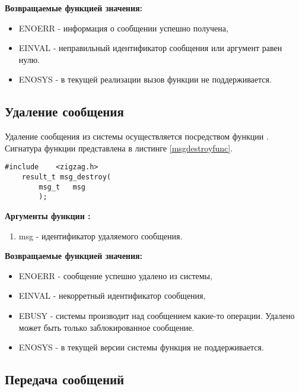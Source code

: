 {\bfseries Возвращаемые функцией  значения:}

{\itshape
\begin{itemize}
\item ENOERR - информация о сообщении успешно получена,
\item EINVAL - неправильный идентификатор сообщения или аргумент  равен нулю.
\item ENOSYS - в текущей реализации вызов функции не поддерживается.
\end{itemize}
}

\subsection{Удаление сообщения}

Удаление сообщения из системы осуществляется посредством функции . 
Сигнатура функции представлена в листинге \ref{msgdestroyfunc}.

\begin{lstlisting}[caption=Функция \myfunc{msg\_destroy()} - удаление сообщения., label=msgdestroyfunc ]
    #include    <zigzag.h>
    result_t msg_destroy(
        msg_t   msg
        );
\end{lstlisting}

{\bfseries Аргументы функции :}

{\itshape
\begin{enumerate}
\item msg - идентификатор удаляемого сообщения.
\end{enumerate}
}

{\bfseries Возвращаемые функцией  значения:}

{\itshape
\begin{itemize}
\item ENOERR - сообщение успешно удалено из системы,
\item EINVAL - некорретный идентификатор сообщения,
\item EBUSY - системы производит над сообщением какие-то операции. Удалено может быть только 
заблокированное сообщение.
\item ENOSYS - в текущей версии системы функция не поддерживается.
\end{itemize}
}

\subsection{Передача сообщений}

